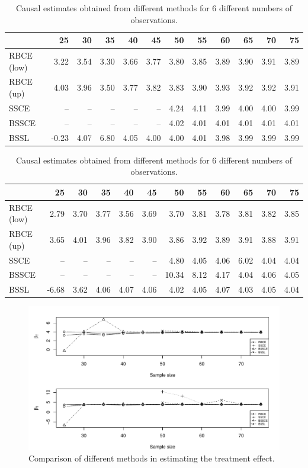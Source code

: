 \documentclass{amsart}
\begin{document}
\begin{table}[ht]
\caption{Causal estimates obtained from different methods
for 6 different
numbers of observations.}\label{tab:causal}
\centering
{}
\begin{tabular}{l|rrrrrrrrrrr}
  \hline
 & 25 & 30 & 35 & 40 & 45 & 50 & 55 & 60 & 65 & 70 & 75 \\ 
  \hline
RBCE (low) & 3.22 & 3.54 & 3.30 & 3.66 & 3.77 & 3.80 & 3.85 & 3.89 & 3.90 & 3.91 & 3.89 \\ 
  RBCE (up) & 4.03 & 3.96 & 3.50 & 3.77 & 3.82 & 3.83 & 3.90 & 3.93 & 3.92 & 3.92 & 3.91 \\ 
  SSCE & -- & -- & -- & -- & -- & 4.24 & 4.11 & 3.99 & 4.00 & 4.00 & 3.99 \\ 
  BSSCE & -- & -- & -- & -- & -- & 4.02 & 4.01 & 4.01 & 4.01 & 4.01 & 4.01 \\ 
  BSSL & -0.23 & 4.07 & 6.80 & 4.05 & 4.00 & 4.00 & 4.01 & 3.98 & 3.99 & 3.99 & 3.99 \\ 
   \hline
\end{tabular}
\begin{tabular}{l|rrrrrrrrrrr}
  \hline
 & 25 & 30 & 35 & 40 & 45 & 50 & 55 & 60 & 65 & 70 & 75 \\ 
  \hline
RBCE (low) & 2.79 & 3.70 & 3.77 & 3.56 & 3.69 & 3.70 & 3.81 & 3.78 & 3.81 & 3.82 & 3.85 \\ 
  RBCE (up) & 3.65 & 4.01 & 3.96 & 3.82 & 3.90 & 3.86 & 3.92 & 3.89 & 3.91 & 3.88 & 3.91 \\ 
  SSCE & -- & -- & -- & -- & -- & 4.80 & 4.05 & 4.06 & 6.02 & 4.04 & 4.04 \\ 
  BSSCE & -- & -- & -- & -- & -- & 10.34 & 8.12 & 4.17 & 4.04 & 4.06 & 4.05 \\ 
  BSSL & -6.68 & 3.62 & 4.06 & 4.07 & 4.06 & 4.02 & 4.05 & 4.07 & 4.03 & 4.05 & 4.04 \\ 
   \hline
\end{tabular}
\end{table}

\begin{figure}
    \centering
    \includegraphics[width = 0.9\linewidth]{RBCE_comp.pdf}
    \caption{Comparison of different methods in estimating the treatment effect.}
    \label{fig:comp:trt}
\end{figure}
\end{document}
